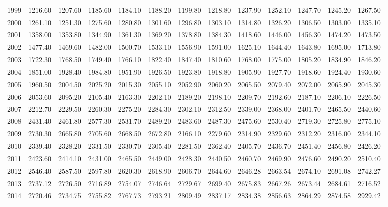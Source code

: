 \begin{longtable}{rrrrrrrrrrrrr}
  1999 & 1216.60 & 1207.60 & 1185.60 & 1184.10 & 1188.20 & 1199.80 & 1218.80 & 1237.90 & 1252.10 & 1247.70 & 1245.20 & 1267.50 \\ 
  2000 & 1261.10 & 1251.30 & 1275.60 & 1280.80 & 1301.60 & 1296.80 & 1303.10 & 1314.80 & 1326.20 & 1306.50 & 1303.00 & 1335.10 \\ 
  2001 & 1358.00 & 1353.80 & 1344.90 & 1361.30 & 1369.20 & 1378.80 & 1384.30 & 1418.60 & 1446.00 & 1456.30 & 1474.20 & 1473.50 \\ 
  2002 & 1477.40 & 1469.60 & 1482.00 & 1500.70 & 1533.10 & 1556.90 & 1591.00 & 1625.10 & 1644.40 & 1643.80 & 1695.00 & 1713.80 \\ 
  2003 & 1722.30 & 1768.50 & 1749.40 & 1766.10 & 1822.40 & 1847.40 & 1810.60 & 1768.00 & 1775.00 & 1805.20 & 1834.90 & 1846.20 \\ 
  2004 & 1851.00 & 1928.40 & 1984.80 & 1951.90 & 1926.50 & 1923.80 & 1918.80 & 1905.90 & 1927.70 & 1918.60 & 1924.40 & 1930.60 \\ 
  2005 & 1960.50 & 2004.50 & 2025.20 & 2015.30 & 2055.10 & 2052.90 & 2060.20 & 2065.50 & 2079.40 & 2072.00 & 2065.90 & 2045.30 \\ 
  2006 & 2053.60 & 2095.20 & 2105.40 & 2163.30 & 2202.10 & 2189.20 & 2198.10 & 2209.70 & 2192.60 & 2187.10 & 2206.10 & 2226.50 \\ 
  2007 & 2212.70 & 2229.50 & 2260.30 & 2275.20 & 2284.30 & 2302.10 & 2312.50 & 2339.00 & 2368.00 & 2401.70 & 2465.50 & 2440.60 \\ 
  2008 & 2431.40 & 2461.80 & 2577.30 & 2531.70 & 2489.20 & 2483.60 & 2487.30 & 2475.60 & 2530.40 & 2719.30 & 2725.80 & 2775.10 \\ 
  2009 & 2730.30 & 2665.80 & 2705.60 & 2668.50 & 2672.80 & 2166.10 & 2279.60 & 2314.90 & 2329.60 & 2312.20 & 2316.00 & 2344.10 \\ 
  2010 & 2339.40 & 2328.20 & 2331.50 & 2330.70 & 2305.40 & 2281.50 & 2362.40 & 2405.70 & 2436.70 & 2451.40 & 2456.80 & 2426.20 \\ 
  2011 & 2423.60 & 2414.10 & 2431.00 & 2465.50 & 2449.00 & 2428.30 & 2440.50 & 2460.70 & 2469.90 & 2476.60 & 2490.20 & 2510.40 \\ 
  2012 & 2546.40 & 2587.50 & 2597.80 & 2620.30 & 2618.90 & 2606.70 & 2644.60 & 2646.28 & 2663.54 & 2674.10 & 2691.08 & 2742.27 \\ 
  2013 & 2737.12 & 2726.50 & 2716.89 & 2754.07 & 2746.64 & 2729.67 & 2699.40 & 2675.83 & 2667.26 & 2673.44 & 2684.61 & 2716.52 \\ 
  2014 & 2720.46 & 2734.75 & 2755.82 & 2767.73 & 2793.21 & 2809.49 & 2837.17 & 2834.38 & 2856.63 & 2864.29 & 2874.58 & 2929.42 \\ 

\end{longtable}
